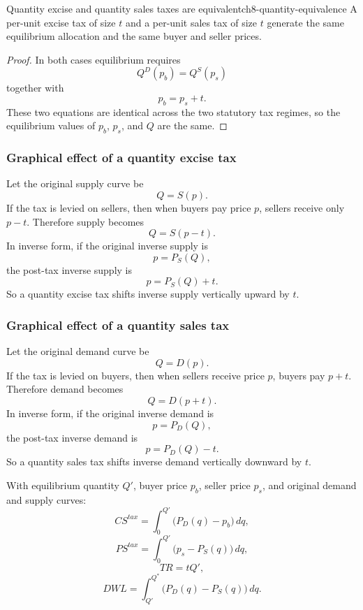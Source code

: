 \begin{theorem}{Quantity excise and quantity sales taxes are equivalent}{ch8-quantity-equivalence}
A per-unit excise tax of size $t$ and a per-unit sales tax of size $t$ generate the same equilibrium allocation and the same buyer and seller prices.
\end{theorem}

\begin{proof}
In both cases equilibrium requires
\[
Q^D(p_b)=Q^S(p_s)
\]
together with
\[
p_b=p_s+t.
\]
These two equations are identical across the two statutory tax regimes, so the equilibrium values of $p_b$, $p_s$, and $Q$ are the same.
\end{proof}

\subsubsection{Graphical effect of a quantity excise tax}

Let the original supply curve be
\[
Q=S(p).
\]
If the tax is levied on sellers, then when buyers pay price $p$, sellers receive only $p-t$. Therefore supply becomes
\[
Q=S(p-t).
\]
In inverse form, if the original inverse supply is
\[
p=P_S(Q),
\]
the post-tax inverse supply is
\[
p=P_S(Q)+t.
\]
So a quantity excise tax shifts inverse supply vertically upward by $t$.

\subsubsection{Graphical effect of a quantity sales tax}

Let the original demand curve be
\[
Q=D(p).
\]
If the tax is levied on buyers, then when sellers receive price $p$, buyers pay $p+t$. Therefore demand becomes
\[
Q=D(p+t).
\]
In inverse form, if the original inverse demand is
\[
p=P_D(Q),
\]
the post-tax inverse demand is
\[
p=P_D(Q)-t.
\]
So a quantity sales tax shifts inverse demand vertically downward by $t$.

\begin{keyformula}[title={Key Formula: Welfare Accounting under a Quantity Tax}]
With equilibrium quantity $Q'$, buyer price $p_b$, seller price $p_s$, and original demand and supply curves:
\[
CS^{tax}=\int_0^{Q'} \bigl(P_D(q)-p_b\bigr)\,dq,
\]
\[
PS^{tax}=\int_0^{Q'} \bigl(p_s-P_S(q)\bigr)\,dq,
\]
\[
TR=tQ',
\]
\[
DWL=\int_{Q'}^{Q^*} \bigl(P_D(q)-P_S(q)\bigr)\,dq.
\]
\end{keyformula}

